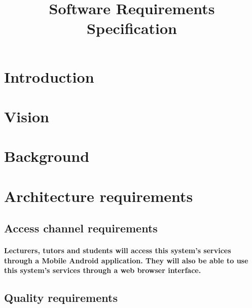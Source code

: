 \documentclass[12pt]{article}
\title{Software Requirements Specification}
\date{}
\begin{document}
  \maketitle  
  \tableofcontents
  \section{Introduction}
  \section{Vision}
  \section{Background}
  \section{Architecture requirements}
  \subsection{Access channel requirements}
  \paragraph*{Lecturers, tutors and students will access this system's services through a Mobile Android application. They will also be able to use this system's services through a web browser interface.}
  \subsection{Quality requirements}
\end{document}
